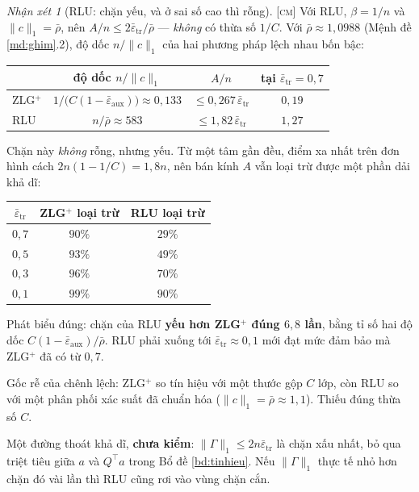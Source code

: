 \documentclass[11pt,a4paper]{article}
\theoremstyle{remark}
\newtheorem{nhanxet}[dinhly]{Nhận xét}
\newcommand{\epstr}{\bar\varepsilon_{\mathrm{tr}}}
\newcommand{\epsaux}{\bar\varepsilon_{\mathrm{aux}}}
\begin{document}
\begin{nhanxet}[RLU: chặn yếu, và ở sai số cao thì rỗng]
\label{nx:rluyeu}
\textsc{[cm]}\; Với RLU, $\beta=1/n$ và $\|c\|_1=\bar\rho$, nên
$A/n\le2\epstr/\bar\rho$ --- \emph{không} có thừa số $1/C$. Với
$\bar\rho\approx1{,}0988$ (Mệnh đề \ref{md:ghim}.2), độ dốc $n/\|c\|_1$ của
hai phương pháp lệch nhau bốn bậc:

\begin{center}
\begin{tabular}{@{}lccc@{}}
\toprule
 & độ dốc $n/\|c\|_1$ & $A/n$ & tại $\epstr=0{,}7$ \\
\midrule
ZLG$^+$ & $1/\bigl(C(1-\epsaux)\bigr)\approx0{,}133$ & $\le0{,}267\,\epstr$ & $0{,}19$ \\
RLU     & $n/\bar\rho\approx583$ & $\le1{,}82\,\epstr$ & $1{,}27$ \\
\bottomrule
\end{tabular}
\end{center}

Chặn này \emph{không} rỗng, nhưng yếu. Từ một tâm gần đều, điểm xa nhất trên
đơn hình cách $2n(1-1/C)=1{,}8n$, nên bán kính $A$ vẫn loại trừ được một phần
dải khả dĩ:

\begin{center}
\begin{tabular}{@{}ccc@{}}
\toprule
$\epstr$ & ZLG$^+$ loại trừ & RLU loại trừ \\
\midrule
$0{,}7$  & $90\%$ & $29\%$ \\
$0{,}5$  & $93\%$ & $49\%$ \\
$0{,}3$  & $96\%$ & $70\%$ \\
$0{,}1$  & $99\%$ & $90\%$ \\
\bottomrule
\end{tabular}
\end{center}

Phát biểu đúng: chặn của RLU \textbf{yếu hơn ZLG$^+$ đúng $6{,}8$ lần}, bằng
tỉ số hai độ dốc $C(1-\epsaux)/\bar\rho$. RLU phải xuống tới
$\epstr\approx0{,}1$ mới đạt mức đảm bảo mà ZLG$^+$ đã có từ $0{,}7$.

Gốc rễ của chênh lệch: ZLG$^+$ so tín hiệu với một thước gộp $C$ lớp, còn RLU
so với một phân phối xác suất đã chuẩn hóa ($\|c\|_1=\bar\rho\approx1{,}1$).
Thiếu đúng thừa số $C$.

Một đường thoát khả dĩ, \textbf{chưa kiểm}: $\|\Gamma\|_1\le2n\epstr$ là chặn
xấu nhất, bỏ qua triệt tiêu giữa $a$ và $Q^{\!\top}a$ trong Bổ đề
\ref{bd:tinhieu}. Nếu $\|\Gamma\|_1$ thực tế nhỏ hơn chặn đó vài lần thì RLU
cũng rơi vào vùng chặn cắn.
\end{nhanxet}
\end{document}
